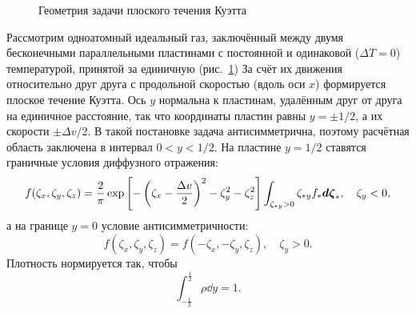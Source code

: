 \begin{figure}[ht]
    \centering
    \caption{Геометрия задачи плоского течения Куэтта}\label{fig:couette}
\end{figure}

Рассмотрим одноатомный идеальный газ, заключённый между двумя бесконечными параллельными пластинами
с постоянной и одинаковой (\(\Delta{T}=0\)) температурой, принятой за единичную (рис.~\ref{fig:couette})
За счёт их движения относительно друг друга с продольной скоростью (вдоль оси \(x\))
формируется плоское течение Куэтта.
Ось \(y\) нормальна к пластинам, удалённым друг от друга на единичное расстояние,
так что координаты пластин равны \(y=\pm1/2\), а их скорости \(\pm\Delta{v}/2\).
В такой постановке задача антисимметрична, поэтому расчётная область заключена в интервал \(0<y<1/2\).
На пластине \(y=1/2\) ставятся граничные условия диффузного отражения:
\begin{equation}\label{eq:couette:diffuse_bc}
    f(\zeta_x,\zeta_y,\zeta_z) = \frac2{\pi} \exp\left[-\left(\zeta_x-\frac{\Delta{v}}{2}\right)^2-\zeta_y^2-\zeta_z^2\right]
        \int_{\zeta_{*y}>0}\zeta_{*y} f_* \boldsymbol{d\zeta}_*, \quad \zeta_y<0,
\end{equation}
а на границе \(y=0\) условие антисимметричности:
\begin{equation}\label{eq:couette:antisymmetry_bc}
    f(\zeta_x,\zeta_y,\zeta_z) = f(-\zeta_x,-\zeta_y,\zeta_z), \quad \zeta_y>0.
\end{equation}
Плотность нормируется так, чтобы
\begin{equation}\label{eq:total_mass}
    \int_{-\frac12}^\frac12\rho\dd{y} = 1.
\end{equation}

